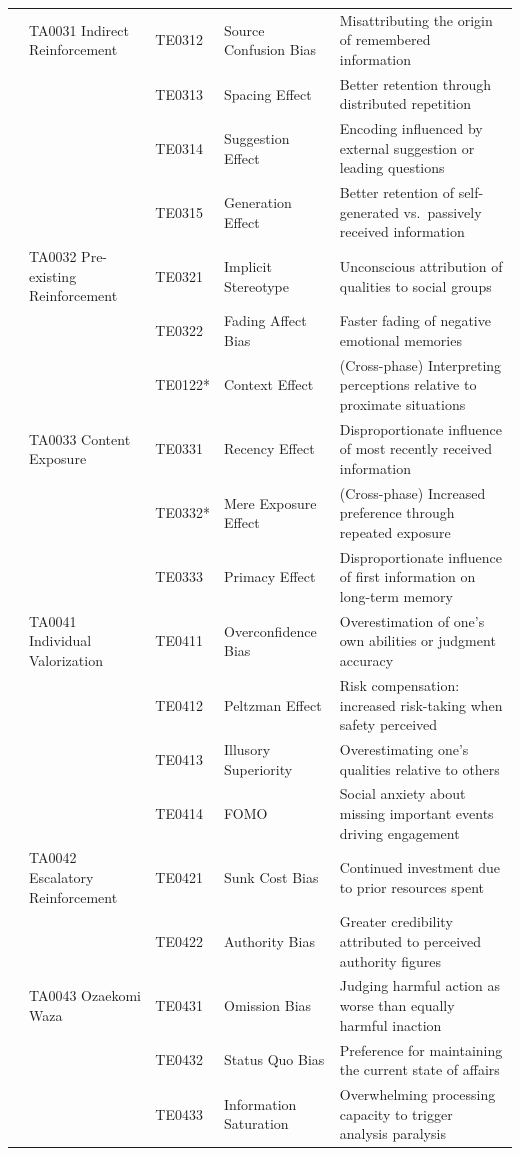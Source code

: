 \documentclass[11pt,a4paper]{article}
\begin{document}
\begin{small}
\begin{longtable}{C{1.2cm}L{3.2cm}C{1.2cm}L{3cm}L{5.5cm}}
 & TA0031 Indirect Reinforcement & TE0312 & Source Confusion Bias & Misattributing the origin of remembered information \\
 & & TE0313 & Spacing Effect & Better retention through distributed repetition \\
 & & TE0314 & Suggestion Effect & Encoding influenced by external suggestion or leading questions \\
 & & TE0315 & Generation Effect & Better retention of self-generated vs.\ passively received information \\
\cmidrule(l){2-5}
 & TA0032 Pre-existing Reinforcement & TE0321 & Implicit Stereotype & Unconscious attribution of qualities to social groups \\
 & & TE0322 & Fading Affect Bias & Faster fading of negative emotional memories \\
 & & TE0122* & Context Effect & (Cross-phase) Interpreting perceptions relative to proximate situations \\
\cmidrule(l){2-5}
 & TA0033 Content Exposure & TE0331 & Recency Effect & Disproportionate influence of most recently received information \\
 & & TE0332* & Mere Exposure Effect & (Cross-phase) Increased preference through repeated exposure \\
 & & TE0333 & Primacy Effect & Disproportionate influence of first information on long-term memory \\

\midrule

 & TA0041 Individual Valorization & TE0411 & Overconfidence Bias & Overestimation of one's own abilities or judgment accuracy \\
 & & TE0412 & Peltzman Effect & Risk compensation: increased risk-taking when safety perceived \\
 & & TE0413 & Illusory Superiority & Overestimating one's qualities relative to others \\
 & & TE0414 & FOMO & Social anxiety about missing important events driving engagement \\
\cmidrule(l){2-5}
 & TA0042 Escalatory Reinforcement & TE0421 & Sunk Cost Bias & Continued investment due to prior resources spent \\
 & & TE0422 & Authority Bias & Greater credibility attributed to perceived authority figures \\
\cmidrule(l){2-5}
 & TA0043 Ozaekomi Waza & TE0431 & Omission Bias & Judging harmful action as worse than equally harmful inaction \\
 & & TE0432 & Status Quo Bias & Preference for maintaining the current state of affairs \\
 & & TE0433 & Information Saturation & Overwhelming processing capacity to trigger analysis paralysis \\

\end{longtable}
\end{small}
\end{document}
